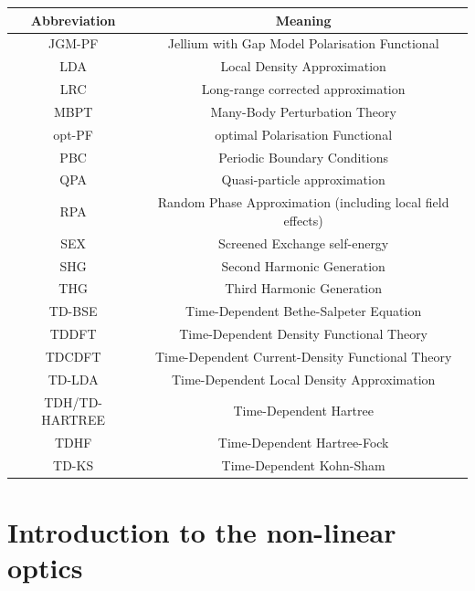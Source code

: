 \begin{center}
\begin{table}
\footnotesize
\begin{tabular}{c|c}
\hline
\textbf{Abbreviation} & \textbf{Meaning} \\
\hline
JGM-PF & Jellium with Gap Model Polarisation Functional\\
LDA & Local Density Approximation\\
LRC & Long-range corrected approximation\\
MBPT & Many-Body Perturbation Theory\\
opt-PF & optimal Polarisation Functional\\
PBC & Periodic Boundary Conditions\\
QPA & Quasi-particle approximation\\
RPA & Random Phase Approximation (including local field effects)\\
SEX & Screened Exchange self-energy \\
SHG & Second Harmonic Generation\\
THG & Third Harmonic Generation   \\
TD-BSE & Time-Dependent Bethe-Salpeter Equation   \\
TDDFT & Time-Dependent Density Functional Theory   \\
TDCDFT & Time-Dependent Current-Density Functional Theory   \\
TD-LDA & Time-Dependent Local Density Approximation\\
TDH/TD-HARTREE & Time-Dependent Hartree   \\
TDHF & Time-Dependent Hartree-Fock   \\
TD-KS & Time-Dependent Kohn-Sham   \\
\end{tabular}
\end{table}
\end{center}
                      

\chapter{Introduction to the non-linear optics} 

